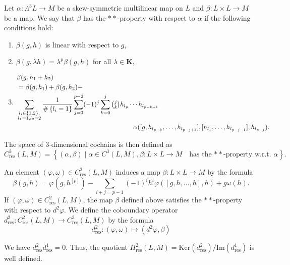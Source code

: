 \documentclass[11pt, twoside]{article}
\begin{document}
\begin{defi}\cite{E96}
    Let $\alpha:\Lambda^3L\to M$ be a skew-symmetric multilinear map on $L$ and $\beta:L\times L\to M $ be a map.  We say that $\beta$ has the $\ast\ast$-property with respect to $\alpha$ if the following conditions hold: \begin{enumerate}
    \item $\beta(g,h)$ is linear with respect to $g$, 
    \item $\beta(g,\lambda h)= \lambda^p\beta(g,h) $ for all $\lambda\in \mathbf{K}$,
    \item \begin{align*}
        &\beta(g,h_1+h_2)\\ &=\beta(g,h_1)+\beta(g,h_2)-\\& \sum_{\substack{l_i\in \left\{1,2\right\},\\ l_1=1,l_2=2}}\frac{1}{\#\left\{l_i=1\right\}}\sum\limits_{j=0}^{p-2}(-1)^j\sum\limits_{k=0}^j\tbinom{j}{k}h_{l_p}\cdots h_{l_{p-k+1}}\\ & \,\,\,\,\,\,\,\,\,\,\,\,\,\,\,\,\,\,\,\,\,\,\,\,\,\,\,\,\,\,\,\,\,\,\,\,\,\,\,\,\,\,\,\,\,\,\,\,\,\,\,\,\,\,\,\,\,\,\,\,\,\,\,\,\,\,\,\,\,\,\,\,\,\,\,\,\,\,\,\,\,\,\,\,\,\,\,\,\,\,\,\,\,\,\,\,\,\,\,\,\,\,\,\,\,\,\,\alpha([g,h_{l_{p-k}},\ldots,h_{l_{p-j+1}}],[h_{l_1},\ldots,h_{l_{p-j-1}}],h_{l_{p-j}}).
    \end{align*}
\end{enumerate} The space of $3$-dimensional cochains is then defined as $$C_\mathrm{res}^3(L,M)=\left\{ (\alpha,\beta)\mid \alpha\in C^3(L,M), \beta:L\times L\to M \quad \text{has the $\ast\ast$-property w.r.t. $\alpha$}  \right\}. $$
\end{defi}

An element $(\varphi,\omega)\in C_\mathrm{res}^2(L,M)$ induces a map $\beta:L\times L\to M $ by the formula $$\beta(g,h)=\varphi(g,h^{[p]})-\sum\limits_{i+j=p-1}(-1)^ih^i\varphi([g,h,\ldots,h],h)+ g\omega(h). $$ If $(\varphi,\omega)\in C_\mathrm{res}^2(L,M) $, the map $\beta$ defined above satisfies the $\ast\ast $-property with respect to $d^2\varphi $. We define the coboundary operator $d_\mathrm{res}^2:C_\mathrm{res}^2(L,M)\to C_\mathrm{res}^3(L,M)$ by the formula $$d_\mathrm{res}^2:(\varphi,\omega)\mapsto (d^2\varphi,\beta) $$

\begin{thm}\cite{E96}
    We have $d_\mathrm{res}^2d_\mathrm{res}^1=0 $. Thus, the quotient $H_\mathrm{res}^2(L,M)=\mathrm{Ker}(d_\mathrm{res}^2)/\mathrm{Im}(d_\mathrm{res}^1) $ is well defined.
\end{thm}
 
\end{document}
